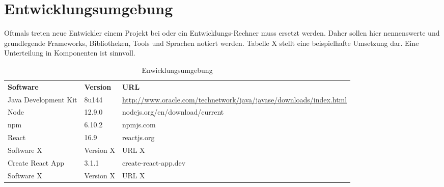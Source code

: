 \section{Entwicklungsumgebung}\label{sec:entwicklungsumgebung}
\begin{tcolorbox}
	Oftmals treten neue Entwickler einem Projekt bei oder ein Entwicklungs-Rechner muss ersetzt werden.
	Daher sollen hier nennenswerte und grundlegende Frameworks, Bibliotheken, Tools und Sprachen notiert werden.
	Tabelle X stellt eine beispielhafte Umsetzung dar.
	Eine Unterteilung in Komponenten ist sinnvoll.
\end{tcolorbox}

\begin{table}[h]
	\centering
	\begin{tabularx}{\textwidth}{l l X}
		\rowcolor[HTML]{C0C0C0} 
		\textbf{Software} & \textbf{Version} & \textbf{URL} \\
		Java Development Kit & 8u144 & \url{http://www.oracle.com/technetwork/java/javase/downloads/index.html} \\
		\rowcolor[HTML]{E7E7E7} 
		Node & 12.9.0 & nodejs.org/en/download/current \\
		npm & 6.10.2 & npmjs.com \\
		\rowcolor[HTML]{E7E7E7} 
		React &16.9 &reactjs.org\\
		Software X & Version X & URL X \\
		\rowcolor[HTML]{E7E7E7} 
		Create React App & 3.1.1 & create-react-app.dev \\
		Software X & Version X & URL X \\
	\end{tabularx}
	\caption{Enwicklungsumgebung}
	\label{table:entwicklungsumgebung}
\end{table}